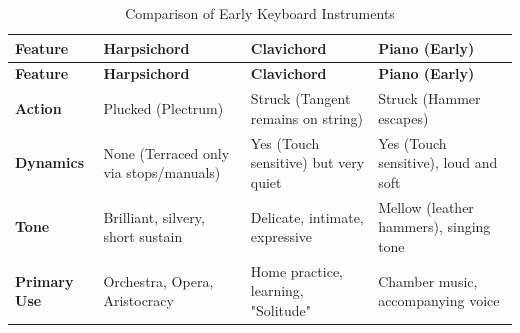 \documentclass[math,code]{amznotes}
\theoremstyle{remark}
\begin{document}
\begin{longtable}{p{} p{} p{} p{}}
\caption{Comparison of Early Keyboard Instruments} \\
\toprule
\textbf{Feature} & \textbf{Harpsichord} & \textbf{Clavichord} & \textbf{Piano (Early)} \\
\midrule
\endfirsthead

\toprule
\textbf{Feature} & \textbf{Harpsichord} & \textbf{Clavichord} & \textbf{Piano (Early)} \\
\midrule
\endhead

\bottomrule
\endfoot

\textbf{Action} & Plucked (Plectrum) & Struck (Tangent remains on string) & Struck (Hammer escapes) \\
\midrule
\textbf{Dynamics} & None (Terraced only via stops/manuals) & Yes (Touch sensitive) but very quiet & Yes (Touch sensitive), loud and soft \\
\midrule
\textbf{Tone} & Brilliant, silvery, short sustain & Delicate, intimate, expressive & Mellow (leather hammers), singing tone \\
\midrule
\textbf{Primary Use} & Orchestra, Opera, Aristocracy & Home practice, learning, "Solitude" & Chamber music, accompanying voice \\
\end{longtable}
\end{document}
